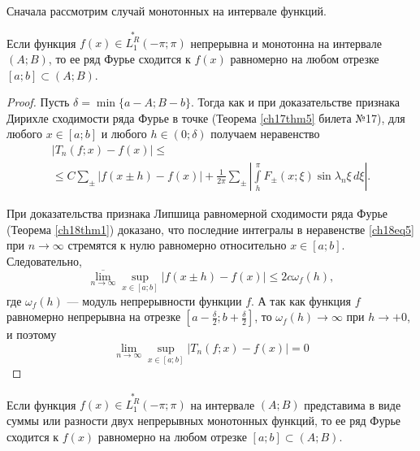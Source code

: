 Сначала рассмотрим случай монотонных на интервале функций.

\begin{thm} \label{ch18thm3}
Если функция $f(x) \in \overset{*}{L^{R}_1}(-\pi;\pi)$ непрерывна и монотонна на интервале $(A;B)$, то ее ряд Фурье сходится к $f(x)$ равномерно на любом отрезке $[a;b] \subset (A;B)$.
\end{thm}
\begin{proof}
Пусть $\delta = \min \{a - A; B - b\}$. Тогда как и при доказательстве признака Дирихле сходимости ряда Фурье в точке (Теорема \ref{ch17thm5} билета №17), для любого $x \in [a;b]$ и любого $h \in (0;\delta)$ получаем неравенство
\begin{multline} \label{ch18eq5}
|T_n(f; x) - f(x)| \le\\
\le C\sum_{\pm}|f(x \pm h) - f(x)| + \frac{1}{2\pi} \sum_{\pm} \left|\int\limits_{h}^{\pi} F_{\pm}(x; \xi) \sin{\lambda_n \xi} \,d\xi \right|.
\end{multline}

При доказательства признака Липшица равномерной сходимости ряда Фурье (Теорема \ref{ch18thm1}) доказано, что последние интегралы в неравенстве \eqref{ch18eq5} при $n \to \infty$ стремятся к нулю равномерно относительно $x \in [a;b]$. Следовательно,
$$
\overline{\lim\limits_{n \to \infty}} \sup \limits_{x \in [a;b]} |f(x \pm h) - f(x)| \le 2c\omega_{f}(h),
$$
где $\omega_{f}(h)$ --- модуль непрерывности функции $f$. А так как функция $f$ равномерно непрерывна на отрезке $\left[a - \frac{\delta}{2}; b + \frac{\delta}{2}\right]$, то $\omega_{f}(h) \to \infty$ при $h \to +0$, и поэтому
$$
\lim\limits_{n \to \infty} \sup\limits_{x \in [a;b]} |T_n(f; x) - f(x)| = 0
$$
\end{proof}
\begin{cons}
Если функция $f(x) \in \overset{*}{L^{R}_1}(-\pi;\pi)$ на интервале $(A;B)$ представима в виде суммы или разности двух непрерывных монотонных функций, то ее ряд Фурье сходится к $f(x)$ равномерно на любом отрезке $[a;b] \subset (A;B)$.
\end{cons}


